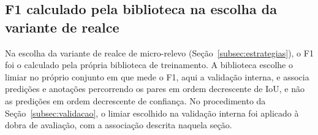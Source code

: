 \documentclass[
    12pt,                %
    openright,           %
    oneside,             %
    a4paper,             %
    english,             %
    brazil               %
]{abntex2}
\begin{document}
\begin{apendicesenv}
\section{F1 calculado pela biblioteca na escolha da variante de realce}

Na escolha da variante de realce de micro-relevo
(Seção~\ref{subsec:estrategias}), o F1 foi o calculado pela própria
biblioteca de treinamento. A biblioteca escolhe o limiar no próprio
conjunto em que mede o F1, aqui a validação interna, e associa
predições e anotações percorrendo os pares em ordem decrescente de IoU,
e não as predições em ordem decrescente de confiança. No procedimento
da Seção~\ref{subsec:validacao}, o limiar escolhido na validação
interna foi aplicado à dobra de avaliação, com a associação descrita
naquela seção.

\end{apendicesenv}
\end{document}
